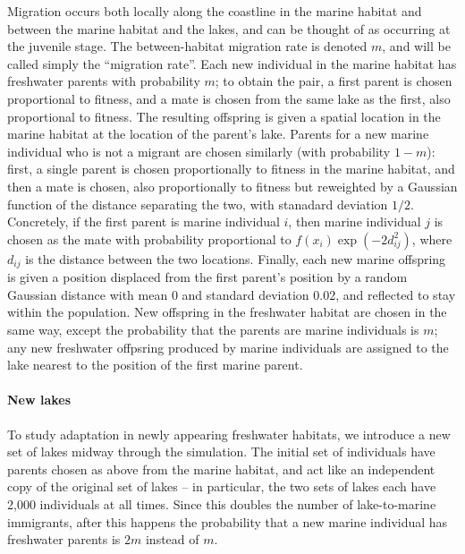 \documentclass{article}
\begin{document}
Migration occurs both locally along the coastline in the marine habitat
and between the marine habitat and the lakes,
and can be thought of as occurring at the juvenile stage.
The between-habitat migration rate is denoted $m$,
and will be called simply the ``migration rate''.
Each new individual in the marine habitat has freshwater parents with probability $m$;
to obtain the pair, a first parent is chosen proportional to fitness,
and a mate is chosen from the same lake as the first, also proportional to fitness.
The resulting offspring is given a spatial location in the marine habitat
at the location of the parent's lake.
Parents for a new marine individual who is not a migrant are chosen similarly (with probability $1-m$):
first, a single parent is chosen proportionally to fitness in the marine habitat,
and then a mate is chosen, 
also proportionally to fitness but reweighted by a Gaussian function 
of the distance separating the two, with stanadard deviation $1/2$. 
Concretely, if the first parent is marine individual $i$,
then marine individual $j$ is chosen as the mate
with probability proportional to $f(x_i) \exp(-2d_{ij}^2)$,
where $d_{ij}$ is the distance between the two locations.
Finally, each new marine offspring is given a position 
displaced from the first parent's position by a random Gaussian distance
with mean 0 and standard deviation 0.02, and reflected to stay within the population.
New offspring in the freshwater habitat are chosen in the same way,
except the probability that the parents are marine individuals is $m$;
any new freshwater offpsring produced by marine individuals
are assigned to the lake nearest to the position of the first marine parent.

\paragraph{New lakes}
To study adaptation in newly appearing freshwater habitats,
we introduce a new set of lakes midway through the simulation.
The initial set of individuals have parents chosen as above from the marine habitat,
and act like an independent copy of the original set of lakes -- in particular,
the two sets of lakes each have 2,000 individuals at all times.
Since this doubles the number of lake-to-marine immigrants,
after this happens the probability that a new marine individual has freshwater parents
is $2m$ instead of $m$.
\end{document}
